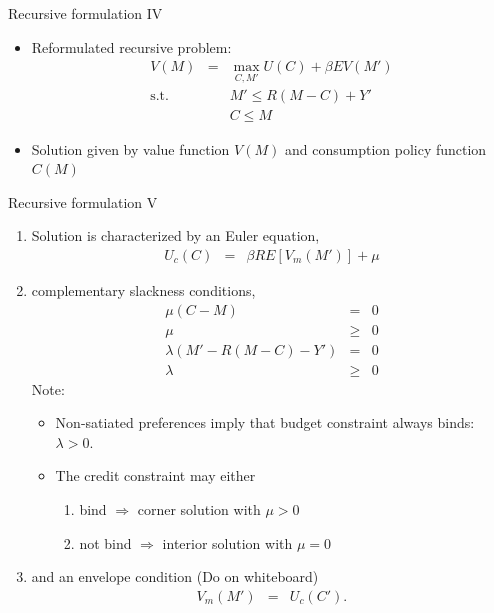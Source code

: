 \documentclass[9pt]{beamer}
\newcommand{\bit}{\begin{itemize}}
\newcommand{\eit}{\end{itemize}}
\newcommand{\ben}{\begin{enumerate}}
\newcommand{\een}{\end{enumerate}}
\newcommand{\rc}{\color{red}}
\begin{document}
\begin{frame}{Recursive formulation IV}

	\bit
	\setlength\itemsep{1em}

	\item Reformulated recursive problem:
	\begin{eqnarray}
	V(M) &=& \max_{C, M'} U(C) + \beta E V(M') \nonumber \\
	\text{s.t.} && M' \leq R(M-C)+Y' \nonumber \\
	&& C \leq M \nonumber
	\end{eqnarray}
	
	\item Solution given by value function $V(M)$ and consumption policy function $C(M)$
	
	\eit
	
	\end{frame}




\begin{frame}{Recursive formulation V}
\ben
\setlength\itemsep{1em}

\item Solution is characterized by an Euler equation,
\begin{eqnarray}
U_c(C) &=& \beta R  E \left[V_m(M')\right] + \mu \nonumber
\end{eqnarray}
\item complementary slackness conditions,
\begin{eqnarray}
\mu(C-M) &=& 0 \nonumber \\
\mu &\geq& 0 \nonumber \\
\lambda (M'-R(M-C)-Y') &=& 0  \nonumber \\
\lambda &\geq& 0 \nonumber
\end{eqnarray}
Note:
\bit
\item Non-satiated preferences imply that budget constraint always binds: $\lambda > 0$.

\item The credit constraint may either
\ben
\item bind $\Rightarrow$ corner solution with $\mu>0$
\item not bind $\Rightarrow$ interior solution with $\mu=0$
\een
\eit

\item and an envelope condition {\rc (Do on whiteboard)}
\begin{eqnarray}
V_m(M') &=& U_c(C'). \nonumber
\end{eqnarray} 

\een

\end{frame}
\end{document}
